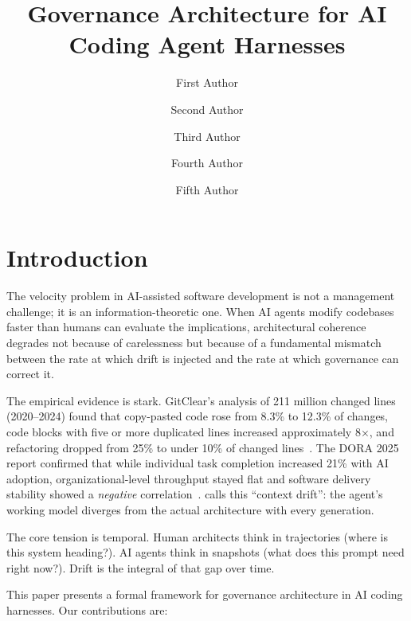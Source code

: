 \documentclass[11pt, a4paper, copyright]{googledeepmind}
\title{Governance Architecture for AI Coding Agent Harnesses}
\author[1]{First Author}
\author[2]{Second Author}
\author[2]{Third Author}
\author[1]{Fourth Author}
\author[1]{Fifth Author}
\affil[*]{Equal Contribution}
\affil[1]{Affiliation 1}
\affil[2]{Affiliation 2}
\begin{document}
\maketitle

\section{Introduction}
\label{sec:intro}

The velocity problem in AI-assisted software development is not a management challenge; it is an information-theoretic one. When AI agents modify codebases faster than humans can evaluate the implications, architectural coherence degrades not because of carelessness but because of a fundamental mismatch between the rate at which drift is injected and the rate at which governance can correct it.

The empirical evidence is stark. GitClear's analysis of 211 million changed lines (2020--2024) found that copy-pasted code rose from 8.3\% to 12.3\% of changes, code blocks with five or more duplicated lines increased approximately 8$\times$, and refactoring dropped from 25\% to under 10\% of changed lines~\citep{gitclear2025}. The DORA 2025 report confirmed that while individual task completion increased 21\% with AI adoption, organizational-level throughput stayed flat and software delivery stability showed a \emph{negative} correlation~\citep{dora2025}. \citet{sylvester2026} calls this ``context drift'': the agent's working model diverges from the actual architecture with every generation.

The core tension is temporal. Human architects think in trajectories (where is this system heading?). AI agents think in snapshots (what does this prompt need right now?). Drift is the integral of that gap over time.

This paper presents a formal framework for governance architecture in AI coding harnesses. Our contributions are:
\end{document}
